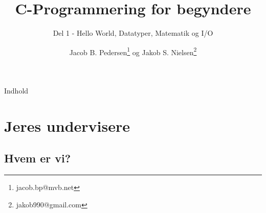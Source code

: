 \documentclass{beamer}
\title{C-Programmering for begyndere}
\subtitle{Del 1 - Hello World, Datatyper, Matematik og I/O}
\author{Jacob B. Pedersen\footnote{jacob.bp@mvb.net} og Jakob S. Nielsen\footnote{jakob990@gmail.com}}
\begin{document}
\begin{frame}
	\maketitle
\end{frame}

\begin{frame}{Indhold}
	\tableofcontents
\end{frame}

\section{Jeres undervisere}
\subsection{Hvem er vi?}
\end{document}
